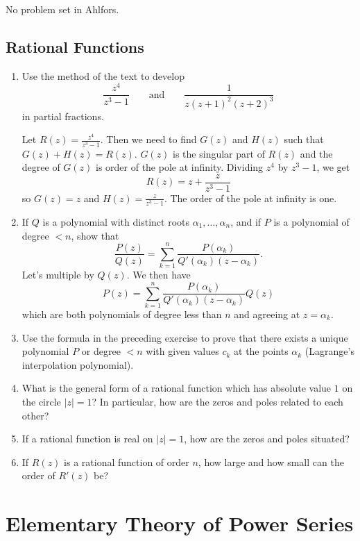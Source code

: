 No problem set in Ahlfors.

\subsection{Rational Functions}

\begin{enumerate}
\item
  Use the method of the text to develop
  \[
  \frac{z^4}{z^3 - 1}\qquad\text{and}\qquad\frac{1}{z(z + 1)^2(z + 2)^3}
  \]
  in partial fractions.
  \par\smallskip
  Let \(R(z) = \frac{z^4}{z^3 - 1}\).
  Then we need to find \(G(z)\) and \(H(z)\) such that \(G(z) + H(z) = R(z)\).
  \(G(z)\) is the singular part of \(R(z)\) and the degree of \(G(z)\) is order
  of the pole at infinity.
  Dividing \(z^4\) by \(z^3 - 1\), we get
  \[
  R(z) = z + \frac{z}{z^3 - 1}
  \]
  so \(G(z) = z\) and \(H(z) = \frac{z}{z^3 - 1}\).
  The order of the pole at infinity is one.
\item
  If \(Q\) is a polynomial with distinct roots \(\alpha_1,\ldots,\alpha_n\),
  and if \(P\) is a polynomial of degree \(< n\), show that
  \[
  \frac{P(z)}{Q(z)} = \sum_{k = 1}^n
  \frac{P(\alpha_k)}{Q'(\alpha_k)(z - \alpha_k)}.
  \]
  Let's multiple by \(Q(z)\).
  We then have
  \[
  P(z) = \sum_{k = 1}^n\frac{P(\alpha_k)}{Q'(\alpha_k)(z - \alpha_k)}Q(z)
  \]
  which are both polynomials of degree less than \(n\) and agreeing at
  \(z = \alpha_k\).
\item
  Use the formula in the preceding exercise to prove that there exists a
  unique polynomial \(P\) or degree \(< n\) with given values \(c_k\) at the
  points \(\alpha_k\) (Lagrange's interpolation polynomial).
\item
  What is the general form of a rational function which has absolute value
  \(1\) on the circle \(\lvert z\rvert = 1\)?
  In particular, how are the zeros and poles related to each other?
\item
  If a rational function is real on \(\lvert z\rvert = 1\), how are the zeros
  and poles situated?
\item
  If \(R(z)\) is a rational function of order \(n\), how large and how small
  can the order of \(R'(z)\) be?
\end{enumerate}

\section{Elementary Theory of Power Series}

